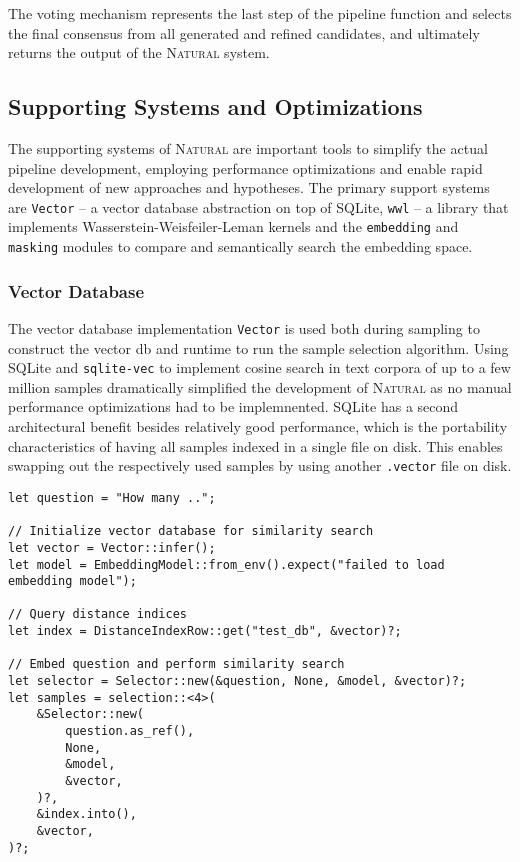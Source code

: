 The voting mechanism represents the last step of the pipeline function 
and selects the final consensus from all generated and refined candidates, 
and ultimately returns the output of the \textsc{Natural} system.

\subsection{Supporting Systems and Optimizations}

The supporting systems of \textsc{Natural} are important tools to simplify the 
actual pipeline development, employing performance optimizations and enable
rapid development of new approaches and hypotheses. The primary support systems
are \texttt{Vector} – a vector database abstraction on top of SQLite,
\texttt{wwl} – a library that implements Wasserstein-Weisfeiler-Leman kernels
\citep{WWL} and the \texttt{embedding} and \texttt{masking} modules to compare
and semantically search the embedding space.

\subsubsection{Vector Database}

The vector database implementation \texttt{Vector} is used both during
sampling to construct the vector db and runtime to run the sample selection
algorithm. Using SQLite and \texttt{sqlite-vec} to implement cosine search in
text corpora of up to a few million samples dramatically simplified the
development of \textsc{Natural} as no manual performance optimizations had to
be implemnented. SQLite has a second architectural benefit besides relatively
good performance, which is the portability characteristics of having all
samples indexed in a single file on disk. This enables swapping out the
respectively used samples by using another \texttt{.vector} file on disk.

\begin{verbatim}
let question = "How many ..";

// Initialize vector database for similarity search
let vector = Vector::infer();
let model = EmbeddingModel::from_env().expect("failed to load embedding model");

// Query distance indices
let index = DistanceIndexRow::get("test_db", &vector)?;

// Embed question and perform similarity search
let selector = Selector::new(&question, None, &model, &vector)?;
let samples = selection::<4>(
    &Selector::new(
        question.as_ref(),
        None,
        &model,
        &vector,
    )?,
    &index.into(),
    &vector,
)?;

\end{verbatim}

